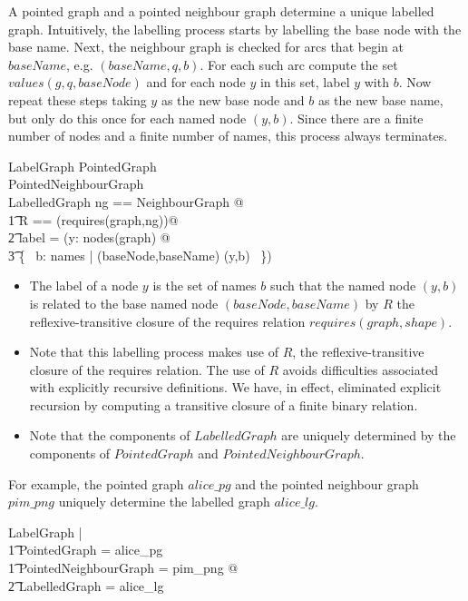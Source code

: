 \documentclass{article}
\begin{document}
A pointed graph and a pointed neighbour graph determine a unique labelled graph.
Intuitively, the labelling process starts by labelling the base node with the base name. 
Next, the neighbour graph is checked for arcs that begin at $baseName$, e.g. $(baseName, q, b)$.
For each such arc compute the set $values(g,q,baseNode)$ and for each node $y$ in this set, label $y$ with $b$.
Now repeat these steps taking $y$ as the new base node and $b$ as the new base name, but only do this
once for each named node $(y,b)$.
Since there are a finite number of nodes and a finite number of names, this process always terminates.
\begin{schema}{LabelGraph}
	PointedGraph \\
	PointedNeighbourGraph \\
	LabelledGraph
\where
	\LET ng == \theta NeighbourGraph @ \\
\t1		\LET R == (requires(graph,ng))\star @ \\
\t2			label = (\lambda y: nodes(graph) @ \\
\t3				\{~ b: names | (baseNode,baseName)  (y,b) ~\})
\end{schema}
\begin{itemize}
\item The label of a node $y$ is the set of names $b$ such that the named node $(y,b)$ is related to the 
base named node $(baseNode,baseName)$ by $R$ the reflexive-transitive closure of the requires relation $requires(graph,shape)$.
\item Note that this labelling process makes use of $R$, the reflexive-transitive closure of the requires relation.
The use of $R$ avoids difficulties associated with explicitly recursive definitions. 
We have, in effect, eliminated explicit recursion by computing a transitive closure of a finite binary relation.
\item Note that the components of $LabelledGraph$ are uniquely determined by the components of $PointedGraph$
and $PointedNeighbourGraph$. 
\end{itemize}

For example, the pointed graph $alice\_pg$ and the pointed neighbour graph $pim\_png$ uniquely determine
the labelled graph $alice\_lg$.
\begin{zed}
	\forall LabelGraph | \\
\t1		\theta PointedGraph = alice\_pg \land \\
\t1		\theta PointedNeighbourGraph = pim\_png @ \\
\t2			\theta LabelledGraph = alice\_lg
\end{zed}
\end{document}
